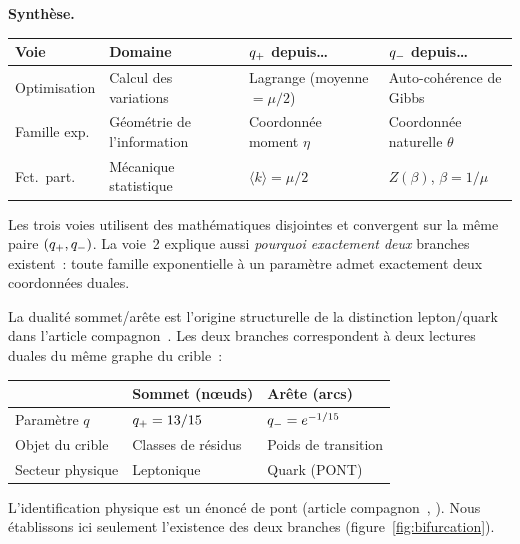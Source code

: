 \documentclass[12pt,a4paper]{article}
\begin{document}
\begin{remarque}
\medskip\noindent
\textbf{Synthèse.}
\begin{center}
\begin{tabular}{llll}
\toprule
\textbf{Voie} & \textbf{Domaine} & \textbf{$q_{+}$ depuis\ldots} & \textbf{$q_{-}$ depuis\ldots} \\
\midrule
Optimisation & Calcul des variations & Lagrange (moyenne $= \mu/2$) & Auto-cohérence de Gibbs \\
Famille exp. & Géométrie de l'information & Coordonnée moment $\eta$ & Coordonnée naturelle $\theta$ \\
Fct.\ part. & Mécanique statistique & $\langle k \rangle = \mu/2$ & $Z(\beta)$, $\beta = 1/\mu$ \\
\bottomrule
\end{tabular}
\end{center}
Les trois voies utilisent des mathématiques disjointes et convergent
sur la même paire $(q_{+}, q_{-})$.
La voie~2 explique aussi \emph{pourquoi exactement deux} branches
existent~: toute famille exponentielle à un paramètre admet exactement
deux coordonnées duales.
\end{remarque}

\begin{remarque}
La dualité sommet/arête est l'origine structurelle de la distinction
lepton/quark dans l'article compagnon~\cite{companion_M5}. Les deux
branches correspondent à deux lectures duales du même graphe du
crible~:
\begin{center}
\begin{tabular}{lll}
\toprule
& \textbf{Sommet (n\oe uds)} & \textbf{Arête (arcs)} \\
\midrule
Paramètre $q$ & $q_{+} = 13/15$ & $q_{-} = e^{-1/15}$ \\
Objet du crible & Classes de résidus & Poids de transition \\
Secteur physique & Leptonique & Quark (PONT) \\
\bottomrule
\end{tabular}
\end{center}
L'identification physique est un énoncé de pont (article
compagnon~\cite{companion_M5}, \BRIDGETAG). Nous établissons ici
seulement l'existence des deux branches
(figure~\ref{fig:bifurcation}).
\end{remarque}
\end{document}
